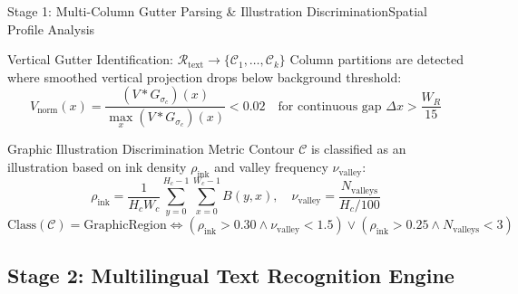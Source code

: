 \documentclass[aspectratio=169]{beamer}
\begin{document}
\begin{frame}{Stage 1: Multi-Column Gutter Parsing \& Illustration Discrimination}{Spatial Profile Analysis}
\begin{block}{Vertical Gutter Identification: $\mathcal{R}_{\text{text}} \rightarrow \{\mathcal{C}_1, \dots, \mathcal{C}_k\}$}
Column partitions are detected where smoothed vertical projection drops below background threshold:
\[
  V_{\text{norm}}(x) = \frac{(V * G_{\sigma_c})(x)}{\max_x (V * G_{\sigma_c})(x)} < 0.02 \quad \text{for continuous gap } \Delta x > \frac{W_R}{15}
\]
\end{block}
\begin{block}{Graphic Illustration Discrimination Metric}
Contour $\mathcal{C}$ is classified as an illustration based on ink density $\rho_{\text{ink}}$ and valley frequency $\nu_{\text{valley}}$:
\[
  \rho_{\text{ink}} = \frac{1}{H_c W_c} \sum_{y=0}^{H_c-1} \sum_{x=0}^{W_c-1} B(y,x), \quad \nu_{\text{valley}} = \frac{N_{\text{valleys}}}{H_c / 100}
\]
\[
  \text{Class}(\mathcal{C}) = \text{GraphicRegion} \iff (\rho_{\text{ink}} > 0.30 \land \nu_{\text{valley}} < 1.5) \lor (\rho_{\text{ink}} > 0.25 \land N_{\text{valleys}} < 3)
\]
\end{block}
\end{frame}

\subsection{Stage 2: Multilingual Text Recognition Engine}
\end{document}
